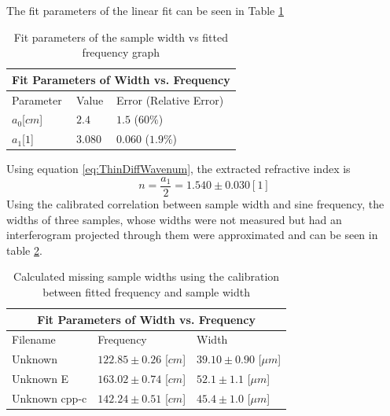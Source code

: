 \documentclass[reprint,amsmath,amssymb,aps, prl]{revtex4-2}
\begin{document}
The fit parameters of the linear fit can be seen in Table \ref{tbl:WidthFit}
\begin{table}[h]
    \begin{tabular}{ |p{2cm}|p{2cm}|p{3.3cm}|  }
     \hline
     \multicolumn{3}{|c|}{Fit Parameters of Width vs. Frequency} \\ \hline
     Parameter & Value & Error (Relative Error)\\ \hline
     $a_{0}$[$cm$]  &$2.4$      &$1.5$ ($60\%$) \\ 
     $a_{1}$[$1$]   &$3.080$    &$0.060$ ($1.9\%$)  \\ \hline
    \end{tabular}
    \caption{Fit parameters of the sample width vs fitted frequency graph}
    \label{tbl:WidthFit}
\end{table}

Using equation \ref{eq:ThinDiffWavenum}, the extracted refractive index is
\begin{equation}
    n = \frac{a_1}{2} = 1.540 \pm 0.030 [1]
\end{equation}
Using the calibrated correlation between sample width and sine frequency, the widths of three samples, whose widths were not measured but had an interferogram projected through them were approximated and can be seen in table \ref{tbl:ThinMissingWidths}.
\begin{table}[h]
    \begin{tabular}{ |p{2.3cm}|p{3cm}|p{3cm}|  }
     \hline
     \multicolumn{3}{|c|}{Fit Parameters of Width vs. Frequency} \\ \hline
     Filename & Frequency & Width\\ \hline
     Unknown  &$122.85\pm0.26$ [$cm$]    &$ 39.10\pm0.90$ [$\mu m$]\\ 
     Unknown E &$163.02\pm0.74$ [$cm$]   &$52.1\pm1.1$ [$\mu m$]\\ 
     Unknown cpp-c&$142.24\pm0.51$ [$cm$]&$45.4\pm1.0$ [$\mu m$]\\ \hline
    \end{tabular}
    \caption{Calculated missing sample widths using the calibration between fitted frequency and sample width}
    \label{tbl:ThinMissingWidths}
\end{table}
\end{document}
